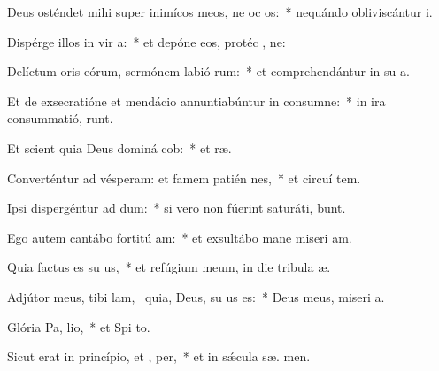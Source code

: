 \item Deus osténdet mihi super inimícos meos, ne oc os:~* nequándo obliviscántur  i.
\item Dispérge illos in vir a:~* et depóne eos, protéc , ne:
\item Delíctum oris eórum, sermónem labió rum:~* et comprehendántur in su a.
\item Et de exsecratióne et mendácio annuntiabúntur in consumne:~* in ira consummatió,   runt.
\item Et scient quia Deus dominá cob:~* et  ræ.
\item Converténtur ad vésperam: et famem patién  nes,~* et circuí tem.
\item Ipsi dispergéntur ad dum:~* si vero non fúerint saturáti,  bunt.
\item Ego autem cantábo fortitú am:~* et exsultábo mane miseri am.
\item Quia factus es su us,~* et refúgium meum, in die tribula æ.
\item Adjútor meus, tibi lam,~\pscross{} quia, Deus, su us es:~* Deus meus, miseri a.
\item Glória Pa,  lio,~* et Spi to.
\item Sicut erat in princípio, et ,  per,~* et in sǽcula sæ. men.
